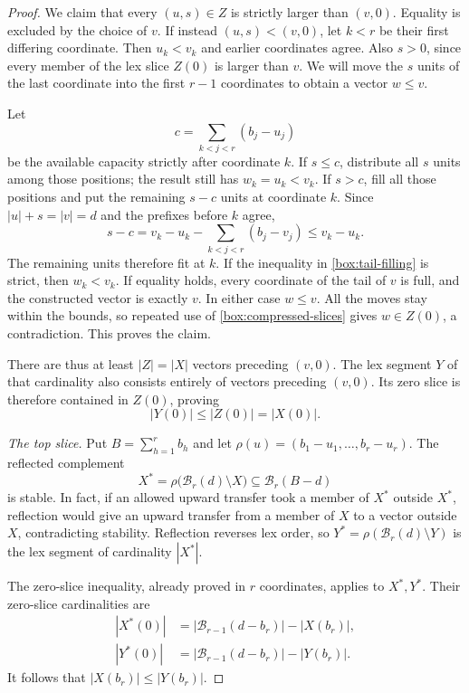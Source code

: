 \begin{proof}
We claim that every \((u,s)\in Z\) is strictly larger than
\((v,0)\).  Equality is excluded by the choice of \(v\).  If instead
\((u,s)<(v,0)\), let \(k<r\) be their first differing coordinate.
Then \(u_k<v_k\) and earlier coordinates agree. Also \(s>0\),
since every member of the lex slice \(Z(0)\) is larger than \(v\).
We will
move the \(s\) units of the last coordinate into the first \(r-1\)
coordinates to obtain a vector \(w\le v\).

Let
\[
 c=\sum_{k<j<r}(b_j-u_j)
\]
be the available capacity strictly after coordinate \(k\).  If
\(s\le c\), distribute all \(s\) units among those positions; the
result still has \(w_k=u_k<v_k\).  If \(s>c\), fill all those
positions and put the remaining \(s-c\) units at coordinate \(k\).
Since \(|u|+s=|v|=d\) and the prefixes before \(k\) agree,
\begin{equation}
 \label{box:tail-filling}
 s-c
   =v_k-u_k-\sum_{k<j<r}(b_j-v_j)
   \le v_k-u_k.
\end{equation}
The remaining units therefore fit at \(k\).  If the inequality in
\eqref{box:tail-filling} is strict, then \(w_k<v_k\).  If equality
holds, every coordinate of the tail of \(v\) is full, and the
constructed vector is exactly \(v\).  In either case \(w\le v\).
All the moves stay within the bounds, so repeated use of
\eqref{box:compressed-slices} gives \(w\in Z(0)\), a contradiction.
This proves the claim.

There are thus at least \(|Z|=|X|\) vectors preceding \((v,0)\).
The lex segment \(Y\) of that cardinality also consists entirely of
vectors preceding \((v,0)\).  Its zero slice is therefore contained
in \(Z(0)\), proving
\begin{equation}
 \label{box:zero-slice}
 |Y(0)|\le|Z(0)|=|X(0)|.
\end{equation}

\smallskip\noindent
\emph{The top slice.}
Put \(B=\sum_{h=1}^r b_h\) and let
\(\rho(u)=(b_1-u_1,\ldots,b_r-u_r)\).  The reflected complement
\[
 X^*=\rho\bigl(\mathcal B_r(d)\setminus X\bigr)
       \subseteq\mathcal B_r(B-d)
\]
is stable.  In fact, if an allowed upward transfer took a member
of \(X^*\) outside \(X^*\), reflection would give an upward transfer
from a member of \(X\) to a vector outside \(X\), contradicting
stability.  Reflection reverses lex order, so
\(Y^*=\rho(\mathcal B_r(d)\setminus Y)\) is the lex segment of
cardinality \(|X^*|\).

The zero-slice inequality, already proved in \(r\) coordinates,
applies to \(X^*,Y^*\).  Their zero-slice cardinalities are
\[
 \begin{split}
 |X^*(0)|&=|\mathcal B_{r-1}(d-b_r)|-|X(b_r)|,\\
 |Y^*(0)|&=|\mathcal B_{r-1}(d-b_r)|-|Y(b_r)|.
 \end{split}
\]
It follows that \(|X(b_r)|\le|Y(b_r)|\).


\end{proof}
